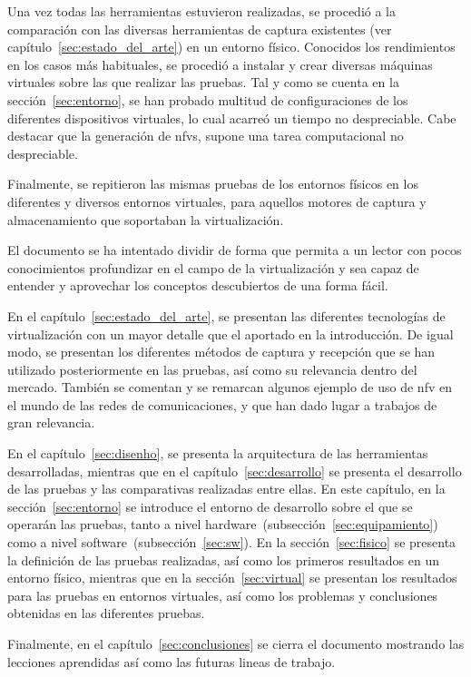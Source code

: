 Una vez todas las herramientas estuvieron realizadas, se procedió a la comparación con las diversas herramientas de captura existentes (ver capítulo~\ref{sec:estado_del_arte}) en un entorno físico. Conocidos los rendimientos en los casos más habituales, se procedió a instalar y crear diversas máquinas virtuales sobre las que realizar las pruebas. Tal y como se cuenta en la sección~\ref{sec:entorno}, se han probado multitud de configuraciones de los diferentes dispositivos virtuales, lo cual acarreó un tiempo no despreciable. Cabe destacar que la generación de \glspl{nfv}, supone una tarea computacional no despreciable.

Finalmente, se repitieron las mismas pruebas de los entornos físicos en los diferentes y diversos entornos virtuales, para aquellos motores de captura y almacenamiento que soportaban la virtualización.


El documento se ha intentado dividir de forma que permita a un lector con pocos conocimientos profundizar en el campo de la virtualización y sea capaz de entender y aprovechar los conceptos descubiertos de una forma fácil.

En el capítulo~\ref{sec:estado_del_arte}, se presentan las diferentes tecnologías de virtualización con un mayor detalle que el aportado en la introducción. De igual modo, se presentan los diferentes métodos de captura y recepción que se han utilizado posteriormente en las pruebas, así como su relevancia dentro del mercado. También se comentan y se remarcan algunos ejemplo de uso de \gls{nfv} en el mundo de las redes de comunicaciones, y que han dado lugar a trabajos de gran relevancia.

En el capítulo~\ref{sec:disenho}, se presenta la arquitectura de las herramientas desarrolladas, mientras que en el capítulo~\ref{sec:desarrollo} se presenta el desarrollo de las pruebas y las comparativas realizadas entre ellas.
En este capítulo, en la sección~\ref{sec:entorno} se introduce el entorno de desarrollo sobre el que se operarán las pruebas, tanto a nivel hardware~(subsección~\ref{sec:equipamiento}) como a nivel software~(subsección~\ref{sec:sw}).
En la sección~\ref{sec:fisico} se presenta la definición de las pruebas realizadas, así como los primeros resultados en un entorno físico, mientras que en la sección~\ref{sec:virtual} se presentan los resultados para las pruebas en entornos virtuales, así como los problemas y conclusiones obtenidas en las diferentes pruebas.


Finalmente, en el capítulo~\ref{sec:conclusiones} se cierra el documento mostrando las lecciones aprendidas así como las futuras lineas de trabajo.
